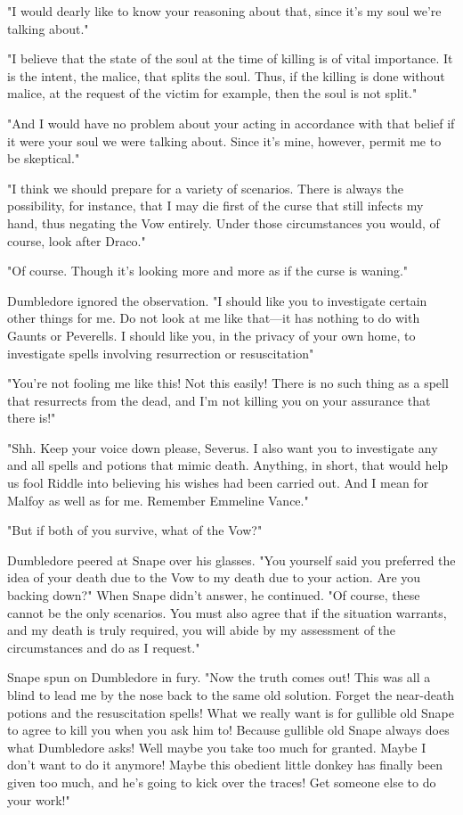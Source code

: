 "I would dearly like to know your reasoning about that, since it's my soul we're talking about."

"I believe that the state of the soul at the time of killing is of vital importance. It is the intent, the malice, that splits the soul. Thus, if the killing is done without malice, at the request of the victim for example, then the soul is not split."

"And I would have no problem about your acting in accordance with that belief if it were your soul we were talking about. Since it's mine, however, permit me to be skeptical."

"I think we should prepare for a variety of scenarios. There is always the possibility, for instance, that I may die first of the curse that still infects my hand, thus negating the Vow entirely. Under those circumstances you would, of course, look after Draco."

"Of course. Though it's looking more and more as if the curse is waning."

Dumbledore ignored the observation. "I should like you to investigate certain other things for me. Do not look at me like that—it has nothing to do with Gaunts or Peverells. I should like you, in the privacy of your own home, to investigate spells involving resurrection or resuscitation{\el}"

"You're not fooling me like this! Not this easily! There is no such thing as a spell that resurrects from the dead, and I'm not killing you on your assurance that there is!"

"Shh. Keep your voice down please, Severus. I also want you to investigate any and all spells and potions that mimic death. Anything, in short, that would help us fool Riddle into believing his wishes had been carried out. And I mean for Malfoy as well as for me. Remember Emmeline Vance."

"But if both of you survive, what of the Vow?"

Dumbledore peered at Snape over his glasses. "You yourself said you preferred the idea of your death due to the Vow to my death due to your action. Are you backing down?" When Snape didn't answer, he continued. "Of course, these cannot be the only scenarios. You must also agree that if the situation warrants, and my death is truly required, you will abide by my assessment of the circumstances and do as I request."

Snape spun on Dumbledore in fury. "Now the truth comes out! This was all a blind to lead me by the nose back to the same old solution. Forget the near-death potions and the resuscitation spells! What we really want is for gullible old Snape to agree to kill you when you ask him to! Because gullible old Snape always does what Dumbledore asks! Well maybe you take too much for granted. Maybe I don't want to do it anymore! Maybe this obedient little donkey has finally been given too much, and he's going to kick over the traces! Get someone else to do your work!"

